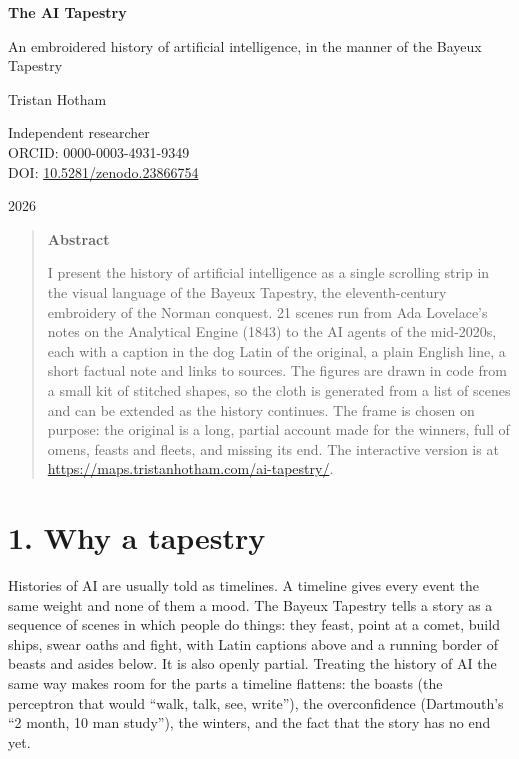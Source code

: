\documentclass[11pt,a4paper]{article}
\begin{document}
\begin{center}
{\Large\bfseries The AI Tapestry\par}\vspace{0.4em}
{\large An embroidered history of artificial intelligence, in the manner of the Bayeux Tapestry\par}\vspace{1.1em}
{\large Tristan Hotham\par}\vspace{0.3em}
{\small Independent researcher\\ ORCID: 0000-0003-4931-9349\\ DOI: \href{https://doi.org/10.5281/zenodo.23866754}{10.5281/zenodo.23866754}\par}\vspace{0.7em}
2026
\end{center}
\begin{quote}\small\begin{center}\textbf{Abstract}\end{center}
I present the history of artificial intelligence as a single scrolling strip in the visual language of the Bayeux Tapestry, the eleventh-century embroidery of the Norman conquest. 21 scenes run from Ada Lovelace's notes on the Analytical Engine (1843) to the AI agents of the mid-2020s, each with a caption in the dog Latin of the original, a plain English line, a short factual note and links to sources. The figures are drawn in code from a small kit of stitched shapes, so the cloth is generated from a list of scenes and can be extended as the history continues. The frame is chosen on purpose: the original is a long, partial account made for the winners, full of omens, feasts and fleets, and missing its end. The interactive version is at \url{https://maps.tristanhotham.com/ai-tapestry/}.
\end{quote}
\section*{1. Why a tapestry}
Histories of AI are usually told as timelines. A timeline gives every event the same weight and none of them a mood. The Bayeux Tapestry tells a story as a sequence of scenes in which people do things: they feast, point at a comet, build ships, swear oaths and fight, with Latin captions above and a running border of beasts and asides below. It is also openly partial. Treating the history of AI the same way makes room for the parts a timeline flattens: the boasts (the perceptron that would ``walk, talk, see, write''), the overconfidence (Dartmouth's ``2 month, 10 man study''), the winters, and the fact that the story has no end yet.
\end{document}
